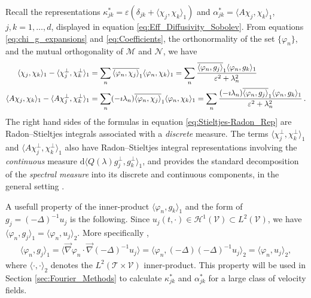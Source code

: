 \documentclass[11pt]{amsart}
\renewcommand{\d}{\mathrm{d}}
\newcommand{\Tc}{\mathcal{T}}
\newcommand{\Vc}{\mathcal{V}}
\newcommand{\Hc}{\mathcal{H}}
\renewcommand{\Mc}{\mathcal{M}}
\newcommand{\Nc}{\mathcal{N}}
\begin{document}
Recall the representations $\kappa^*_{jk}=\varepsilon(\delta_{jk}+\langle\chi_j,\chi_k\rangle_1)$ and
$\alpha^*_{jk}=\langle A\chi_j,\chi_k\rangle_1$, $j,k=1,\ldots,d$, displayed in equation 
\eqref{eq:Eff_Diffusivity_Sobolev}. From equations
\eqref{eq:chi_g_expansions} and \eqref{eq:Coefficients}, the
orthonormality of the set $\{\varphi_n\}$, and the mutual orthogonality of
$\Mc$ and $\Nc$, we have 
%
\begin{align}\label{eq:Stieltjes-Radon_Rep}
  \langle\chi_j,\chi_k\rangle_1-\langle\chi_j^\perp,\chi_k^\perp\rangle_1&=\sum_n\overline{\langle\varphi_n,\chi_j\rangle}_1\langle\varphi_n,\chi_k\rangle_1
         =\sum_n\frac{\overline{\langle\varphi_n,g_j\rangle}_1\langle\varphi_n,g_k\rangle_1}{\varepsilon^2+\lambda_n^2}
         \\
  \langle A\chi_j,\chi_k\rangle_1-\langle A\chi_j^\perp,\chi_k^\perp\rangle_1&=\sum_n(-\imath\lambda_n)\overline{\langle\varphi_n,\chi_j\rangle}_1\langle\varphi_n,\chi_k\rangle_1
         =\sum_n\frac{(-\imath\lambda_n)\overline{\langle\varphi_n,g_j\rangle}_1\langle\varphi_n,g_k\rangle_1}{\varepsilon^2+\lambda_n^2}\,.
         \notag
\end{align}
%
The right hand sides of the formulas in equation
\eqref{eq:Stieltjes-Radon_Rep} are Radon--Stieltjes integrals
associated with a \emph{discrete} measure. The terms $\langle\chi_j^\perp,\chi_k^\perp\rangle_1$ and
$\langle A\chi_j^\perp,\chi_k^\perp\rangle_1$ also have Radon--Stieltjes integral representations
involving the \emph{continuous} measure $\d\langle Q(\lambda)g_j^\perp,g_k^\perp\rangle_1$, and
provides the standard decomposition of the \emph{spectral measure}
into its discrete and continuous components, in the general setting
\cite{Stone:64}.



A usefull property of the inner-product $\langle\varphi_n,g_k\rangle_1$ and the form of
$g_j=(-\Delta)^{-1}u_j$ is the following. Since
$u_j(t,\cdot)\in\Hc^1(\Vc)\subset L^2(\Vc)$, we have 
$\langle\varphi_n,g_j\rangle_1=\langle\varphi_n,u_j\rangle_2$. More specifically \cite{Stakgold:BVP:2000}, 
%
\begin{align}\label{eq:H1_to_L2}
  \langle\varphi_n,g_j\rangle_1=\langle\vec{\nabla}\varphi_n\cdot\vec{\nabla}(-\Delta)^{-1}u_j\rangle
         =\langle\varphi_n,(-\Delta)(-\Delta)^{-1}u_j\rangle_2
         =\langle\varphi_n,u_j\rangle_2,
\end{align}
%
where $\langle\cdot,\cdot\rangle_2$ denotes the $L^2(\Tc\times\Vc)$ inner-product. This
property will be used in Section \ref{sec:Fourier_Methods} to
calculate $\kappa^*_{jk}$ and $\alpha^*_{jk}$ for a large class of velocity
fields.   
\end{document}
